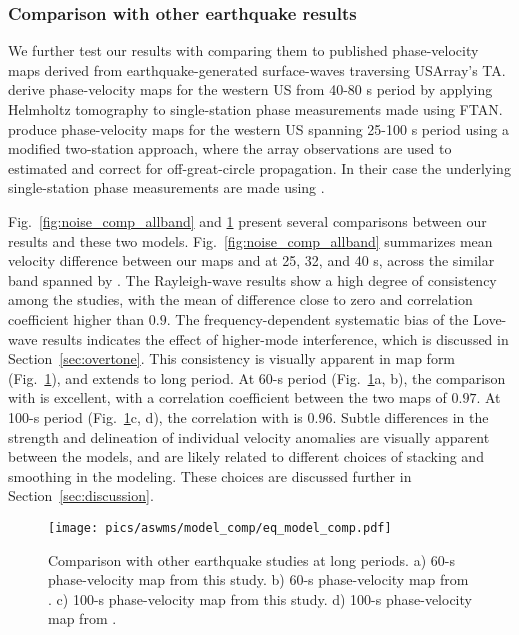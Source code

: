 \subsubsection{Comparison with other earthquake results}

We further test our results with comparing them to published phase-velocity maps derived from earthquake-generated surface-waves traversing USArray's TA. \citet{Lin:2011fw} derive phase-velocity maps for the western US from 40-80 s period by applying Helmholtz tomography to single-station phase measurements made using FTAN. \citet{foster:2014kna} produce phase-velocity maps for the western US spanning 25-100 s period using a modified two-station approach, where the array observations are used to estimated and correct for off-great-circle propagation. In their case the underlying single-station phase measurements are made using \citet{Ekstrom:1997ff}.

Fig.~\ref{fig:noise_comp_allband} and \ref{fig:eq_model_comp} present several comparisons between our results and these two models. Fig.~\ref{fig:noise_comp_allband} summarizes mean velocity difference between our maps and \citet{foster:2014kna} at 25, 32, and 40 s, across the similar band spanned by \citet{Ekstrom:2013dr}. The Rayleigh-wave results show a high degree of consistency among the studies, with the mean of difference close to zero and correlation coefficient higher than $0.9$. The frequency-dependent systematic bias of the Love-wave results indicates the effect of higher-mode interference, which is discussed in Section~\ref{sec:overtone}. This consistency is visually apparent in map form (Fig.~\ref{fig:eq_model_comp}), and extends to long period. At 60-s period (Fig.~\ref{fig:eq_model_comp}a, b), the comparison with \citet{Lin:2011fw} is excellent, with a correlation coefficient between the two maps of $0.97$. At 100-s period (Fig.~\ref{fig:eq_model_comp}c, d), the correlation with \citet{foster:2014kna} is $0.96$. Subtle differences in the strength and delineation of individual velocity anomalies are visually apparent between the models, and are likely related to different choices of stacking and smoothing in the modeling. These choices are discussed further in Section~\ref{sec:discussion}.


\begin{figure}
	\center
	\texttt{[image: pics/aswms/model\_comp/eq\_model\_comp.pdf]}
	\caption{Comparison with other earthquake studies at long periods. a) 60-s phase-velocity map from this study. b) 60-s phase-velocity map from \citet{Lin:2011fw}. c) 100-s phase-velocity map from this study. d) 100-s phase-velocity map from \citet{foster:2014kna}.}
	\label{fig:eq_model_comp}
\end{figure}


